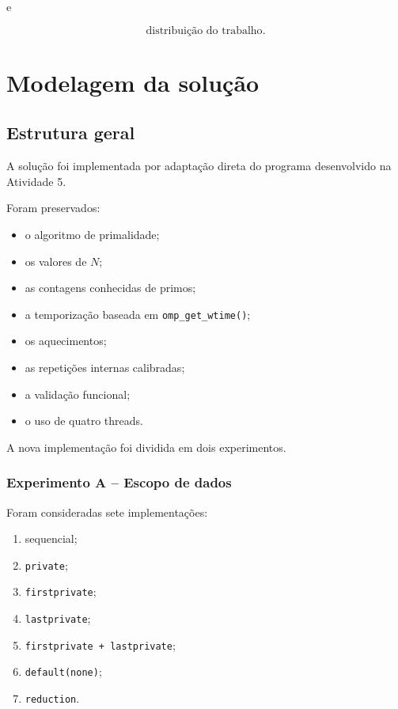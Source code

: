 e

\[
\boxed{\text{distribuição do trabalho}}.
\]


\section{Modelagem da solução}
\label{sec:atvd07-modelagem}

\subsection{Estrutura geral}

A solução foi implementada por adaptação direta do programa desenvolvido na
Atividade 5.

Foram preservados:

\begin{itemize}
    \item o algoritmo de primalidade;
    \item os valores de \(N\);
    \item as contagens conhecidas de primos;
    \item a temporização baseada em \texttt{omp\_get\_wtime()};
    \item os aquecimentos;
    \item as repetições internas calibradas;
    \item a validação funcional;
    \item o uso de quatro threads.
\end{itemize}

A nova implementação foi dividida em dois experimentos.


\subsubsection{Experimento A -- Escopo de dados}

Foram consideradas sete implementações:

\begin{enumerate}
    \item sequencial;
    \item \texttt{private};
    \item \texttt{firstprivate};
    \item \texttt{lastprivate};
    \item \texttt{firstprivate + lastprivate};
    \item \texttt{default(none)};
    \item \texttt{reduction}.
\end{enumerate}

